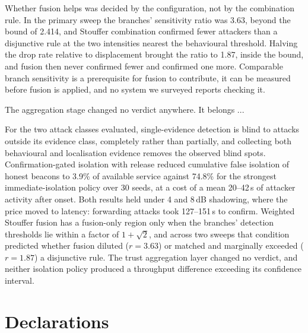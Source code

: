 Whether fusion helps was decided by the configuration, not by the
combination rule. In the primary sweep the branches' sensitivity ratio was
3.63, beyond the bound of 2.414, and Stouffer combination confirmed fewer
attackers than a disjunctive rule at the two intensities nearest the
behavioural threshold. Halving the drop rate relative to displacement
brought the ratio to 1.87, inside the bound, and fusion then never
confirmed fewer and confirmed one more. Comparable branch sensitivity is a
prerequisite for fusion to contribute, it can be measured before fusion is
applied, and no system we surveyed reports checking it.

The aggregation stage changed no verdict anywhere. It belongs ...


For the two attack classes evaluated, single-evidence detection is blind to
attacks outside its evidence class, completely rather than partially, and
collecting both behavioural and localisation evidence removes the observed
blind spots. Confirmation-gated isolation with release reduced cumulative
false isolation of honest beacons to 3.9\% of available service against
74.8\% for the strongest immediate-isolation policy over 30 seeds, at a
cost of a mean 20--42\,s of attacker activity after onset. Both results
held under 4 and 8\,dB shadowing, where the price moved to latency:
forwarding attacks took 127--151\,s to confirm. Weighted Stouffer fusion has a
fusion-only region only when the branches' detection thresholds lie within
a factor of $1+\sqrt{2}$, and across two sweeps that condition predicted
whether fusion diluted ($r = 3.63$) or matched and marginally exceeded
($r = 1.87$) a disjunctive rule. The trust
aggregation layer changed no verdict, and neither isolation policy produced
a throughput difference exceeding its confidence interval.


\section*{Declarations}

